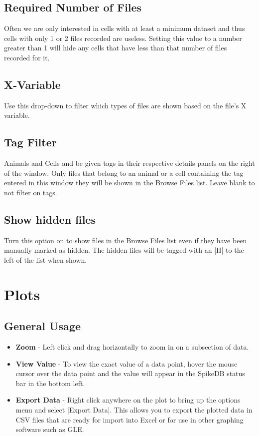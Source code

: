 \documentclass{report}
\begin{document}
\subsection{Required Number of Files}
Often we are only interested in cells with at least a minimum dataset and thus cells with only 1 or 2 files recorded are useless. Setting this value to a number greater than 1 will hide any cells that have less than that number of files recorded for it.

\subsection{X-Variable}
Use this drop-down to filter which types of files are shown based on the file's X variable.

\subsection{Tag Filter}
Animals and Cells and be given tags in their respective details panels on the right of the window. Only files that belong to an animal or a cell containing the tag entered in this window they will be shown in the Browse Files list. Leave blank to not filter on tags.

\subsection{Show hidden files}
Turn this option on to show files in the Browse Files list even if they have been manually marked as hidden. The hidden files will be tagged with an |H| to the left of the list when shown.

\section{Plots}
\subsection{General Usage}
\begin{itemize}
	\item \textbf{Zoom} - Left click and drag horizontally to zoom in on a subsection of data.  
	\item \textbf{View Value} - To view the exact value of a data point, hover the mouse cursor over the data point and the value will appear in the SpikeDB status bar in the bottom left. 
	\item \textbf{Export Data} - Right click anywhere on the plot to bring up the options menu and select |Export Data|. This allows you to export the plotted data in CSV files that are ready for import into Excel or for use in other graphing software such as GLE.
\end{itemize}
\end{document}
